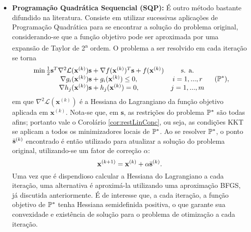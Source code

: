 \begin{itemize}
\item \textbf{Programa\c{c}\~{a}o Quadr\'{a}tica Sequencial (SQP):} \'{E} outro m\'{e}todo bastante difundido na literatura. Consiste em utilizar sucessivas aplica\c{c}\~{o}es de Programa\c{c}\~{a}o Quadr\'{a}tica para se encontrar a solu\c{c}\~{a}o do problema original, considerando-se que a fun\c{c}\~{a}o objetivo pode ser aproximada por uma expans\~{a}o de Taylor de 2\textsuperscript{a} ordem. O problema a ser resolvido em cada itera\c{c}\~{a}o se torna
\begin{equation}
\begin{array}{ccc}
\min \frac{1}{2}\mathbf{s}^{T}\nabla^2 \mathcal{L}(\mathbf{x}^{(k)})\mathbf{s} + \nabla f(\mathbf{x}^{(k)})^{T}\mathbf{s} + f(\mathbf{x}^{(k)})& \text{s. a.} &\\
\nabla g_i (\mathbf{x}^{(k)})\mathbf{s} + g_i (\mathbf{x}^{(k)})\le 0, & i = 1,...,r&\\
\nabla h_j (\mathbf{x}^{(k)})\mathbf{s} + h_j (\mathbf{x}^{(k)}) = 0, & j = 1,...,m&
\end{array} (\mathbb{P}^{*}),
\end{equation}
em que $\nabla^2 \mathcal{L}(\mathbf{x}^{(k)})$ \'{e} a Hessiana do Lagrangiano da fun\c{c}\~{a}o objetivo aplicada em $\mathbf{x}^{(k)}$. Nota-se que, em $\mathbf{s}$, as restri\c{c}\~{o}es do problema $\mathbb{P}^{*}$ s\~{a}o todas afins; portanto vale o Corol\'{a}rio \ref{cor:restLinConc}, ou seja, as condi\c{c}\~{o}es KKT se aplicam a todos os minimizadores locais de $\mathbb{P}^{*}$. Ao se resolver $\mathbb{P}^{*}$, o ponto $\bar{\mathbf{s}}^{(k)}$ encontrado \'{e} ent\~{a}o utilizado para atualizar a solu\c{c}\~{a}o do problema original, utilizando-se um fator de corre\c{c}\~{a}o $\alpha$:
\begin{equation}
\mathbf{x}^{(k+1)} = \mathbf{x}^{(k)} + \alpha \bar{\mathbf{s}}^{(k)}.
\end{equation} 
Uma vez que \'{e} dispendioso calcular a Hessiana do Lagrangiano a cada itera\c{c}\~{a}o, uma alternativa \'{e} aproxim\'{a}-la utilizando uma aproxima\c{c}\~{a}o BFGS, j\'{a} discutida anteriormente. \'{E} de interesse que, a cada itera\c{c}\~{a}o, a fun\c{c}\~{a}o objetivo de $\mathbb{P}^{*}$ tenha Hessiana semidefinida positiva, o que garante sua convexidade e exist\^{e}ncia de solu\c{c}\~{a}o para o problema de otimiza\c{c}\~{a}o a cada itera\c{c}\~{a}o.


\end{itemize}
